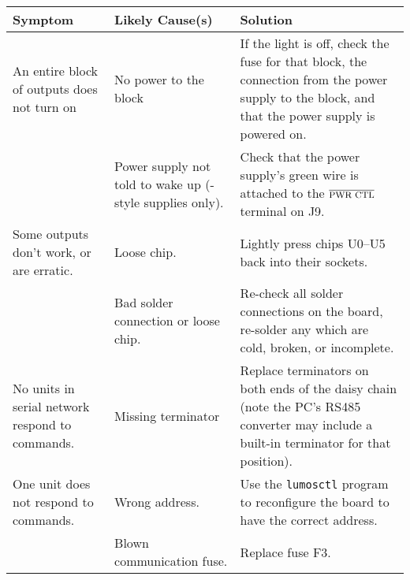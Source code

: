 \documentclass[letterpaper,twoside,onecolumn,openright,final]{memoir}
\begin{document}
\begin{longtable}{|p{1.5in}|p{1.5in}|p{2in}|}\hline
\bfseries Symptom & \bfseries Likely Cause(s) & \bfseries Solution \\\hline\hline
\endhead
An entire block of outputs does not turn on 
	& No power to the block 
	& If the \mc{BLOCK PWR} light is off, check the fuse for that block, 
	  the connection from the power supply to the block, and that the power supply is powered on.\\
\cline{2-3}
	& Power supply not told to wake up (\mc{ATX}-style supplies only).
	& Check that the power supply's green wire is attached to the $\overline{\hbox{\mc{PWR CTL}}}$
	  terminal on J9. \\\hline
Some outputs don't work, or are erratic.
	& Loose %
chip.
	& Lightly press chips U0--U5 back into their sockets.\\
\cline{2-3}
	& Bad solder connection or loose chip.
	& Re-check all solder connections on the board, re-solder any which are cold, broken, or
	  incomplete.\\\hline
No units in serial network respond to commands.
	& Missing terminator
	& Replace terminators on both ends of the daisy chain (note the PC's RS485 converter
	  may include a built-in terminator for that position).\\\hline
One unit does not respond to commands.
	& Wrong address.
	& Use the \verb+lumosctl+ program to reconfigure the board to have
	  the correct address.\\
\cline{2-3}
	& Blown communication fuse.
	& Replace fuse F3.\\\hline
\end{longtable}


\end{document}
